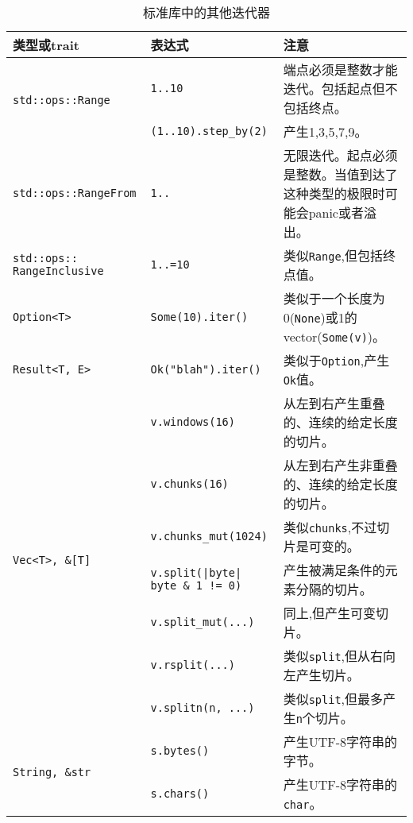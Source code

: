 \begin{longtable}{p{}p{}p{}}
    \caption{标准库中的其他迭代器}
    \label{t15-1}\\
    \hline
    \textbf{类型或trait} & \textbf{表达式} & \textbf{注意} \\
    \hline
    \multirow{2}{*}{\texttt{std::ops::Range}} & \texttt{1..10} & 端点必须是整数才能迭代。包括起点但不包括终点。 \\
    & \texttt{(1..10).step\_by(2)} \cellcolor{tablecolor} & 产生1,3,5,7,9。 \cellcolor{tablecolor} \\
    \hline
    \texttt{std::ops::RangeFrom} & \texttt{1..} & 无限迭代。起点必须是整数。当值到达了这种类型的极限时可能会panic或者溢出。 \\
    \hline
    \rowcolor{tablecolor}
    \texttt{std::ops:: RangeInclusive} & \texttt{1..=10} & 类似\texttt{Range},但包括终点值。 \\
    \hline
    \texttt{Option<T>} & \texttt{Some(10).iter()} & 类似于一个长度为0(\texttt{None})或1的vector(\texttt{Some(v)})。 \\
    \hline
    \rowcolor{tablecolor}
    \texttt{Result<T, E>} & \texttt{Ok("blah").iter()} & 类似于\texttt{Option},产生\texttt{Ok}值。 \\
    \hline
    \multirow{7}{*}{\texttt{Vec<T>, \&[T]}} & \texttt{v.windows(16)} & 从左到右产生重叠的、连续的给定长度的切片。 \\
    & \texttt{v.chunks(16)} \cellcolor{tablecolor} & 从左到右产生非重叠的、连续的给定长度的切片。 \cellcolor{tablecolor} \\
    & \texttt{v.chunks\_mut(1024)} & 类似\texttt{chunks},不过切片是可变的。 \\
    & \texttt{v.split(|byte| byte \& 1 != 0)} \cellcolor{tablecolor} & 产生被满足条件的元素分隔的切片。 \cellcolor{tablecolor} \\
    & \texttt{v.split\_mut(...)} & 同上,但产生可变切片。 \\
    & \texttt{v.rsplit(...)} \cellcolor{tablecolor} & 类似\texttt{split},但从右向左产生切片。 \cellcolor{tablecolor} \\
    & \texttt{v.splitn(n, ...)} & 类似\texttt{split},但最多产生\texttt{n}个切片。 \\
    \hline
    \multirow{5}{*}{\texttt{String, \&str}} & \texttt{s.bytes()} \cellcolor{tablecolor} & 产生UTF-8字符串的字节。 \cellcolor{tablecolor} \\
    & \texttt{s.chars()} & 产生UTF-8字符串的\texttt{char}。 \\

\end{longtable}
